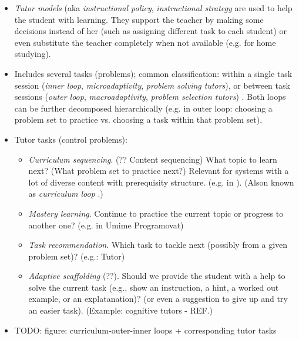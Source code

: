\begin{itemize}
\item \emph{Tutor models} (aka \emph{instructional policy}, \emph{instructional
  strategy} are used to help the student with learning.
  They support the teacher by making some decisions instead of her
  (such as assigning different task to each student)
  or even substitute the teacher completely when not available
  (e.g. for home studying).
\item Includes several tasks (problems); common classification:
  within a single task session
  (\emph{inner loop}, \emph{microadaptivity}, \emph{problem solving tutors}),
  or between task sessions
  (\emph{outer loop}, \emph{macroadaptivity}, \emph{problem selection tutors})
  \cite{its-learner-models}.
  Both loops can be further decomposed hierarchically
  (e.g. in outer loop: choosing a problem set to practice vs. choosing a task
  within that problem set).
\item Tutor tasks (control problems):
\begin{itemize}
\item \emph{Curriculum sequencing}. (?? Content sequencing)
  What topic to learn next? (What problem set to practice next?)
  Relevant for systems with a lot of diverse content with prerequisity structure.
  (e.g. in \cite{its-programming}).  %
  (Alson known as \emph{curriculum loop} \cite{its-learner-models}.)
\item \emph{Mastery learning}.
  Continue to practice the current topic or progress to another one?
  (e.g. in Umime Programovat)
\item \emph{Task recommendation}.
  Which task to tackle next (possibly from a given problem set)?
 (e.g.: Tutor)
\item \emph{Adaptive scaffolding} (??).
  Should we provide the student with a help to solve the current task
  (e.g., show an instruction, a hint, a worked out example, or an explatanation)?
  (or even a suggestion to give up and try an easier task).
  (Example: cognitive tutors - REF.)
\end{itemize}
\item TODO: figure: curriculum-outer-inner loops + corresponding tutor tasks


\end{itemize}
